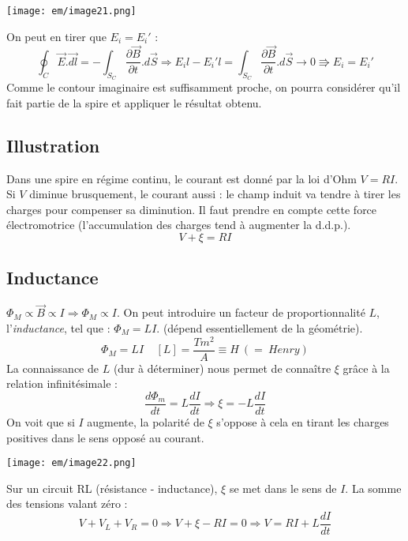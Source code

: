 \documentclass[british,french,11pt, a4paper, openany]{book}
\begin{document}
\begin{center}
	\texttt{[image: em/image21.png]}\\
\end{center}
On peut en tirer que $E_i = E_i'$ :
\begin{equation}
	\oint_C \vec{E}.\vec{dl} = -\int_{S_C}\frac{\partial\vec{B}}{\partial t}.d\vec{S} \Rightarrow E_il - E_i'l = \int_{S_C} \frac{\partial\vec{B}}{\partial t}.d\vec{S} \rightarrow 0 \Rrightarrow E_i = E_i'
\end{equation}
Comme le contour imaginaire est suffisamment proche, on pourra considérer qu'il fait partie de la spire et appliquer le résultat obtenu.

\subsection{Illustration}
Dans une spire en régime continu, le courant est donné par la loi d'Ohm $ V = RI$. Si $V$ diminue brusquement, le courant aussi : le champ induit va tendre à tirer les charges pour compenser sa diminution. Il faut prendre en compte cette force électromotrice (l'accumulation des charges tend à augmenter la d.d.p.).
\begin{equation}
	V + \xi = RI
\end{equation}

\subsection{Inductance}
$\Phi_M \propto \vec{B} \propto I \Rightarrow \Phi_M \propto I$. On peut introduire un facteur de proportionnalité $L$, l'\textit{inductance}, tel que : $\Phi_M = LI$. (dépend essentiellement de la géométrie).
\begin{equation}
	\Phi_M = LI\ \ \ \ \ [L] = \frac{Tm^2}{A} \equiv H\ (=\ Henry)
\end{equation}
La connaissance de $L$ (dur à déterminer) nous permet de connaître $\xi$ grâce à la relation infinitésimale :
\begin{equation}
	\frac{d\Phi_m}{dt} = L \frac{dI}{dt} \Rightarrow \xi = -L\frac{dI}{dt}
\end{equation}
On voit que si $I$ augmente, la polarité de $\xi$ s'oppose à cela en tirant les charges positives dans le sens opposé au courant.
\begin{center}
	\texttt{[image: em/image22.png]}\\
\end{center}
Sur un circuit RL (résistance - inductance), $\xi$ se met dans le sens de $I$. La somme des tensions valant zéro : 
\begin{equation}
	V + V_L + V_R = 0 \Rightarrow V + \xi - RI = 0 \Rightarrow V = RI + L\frac{dI}{dt}
\end{equation}
\end{document}
